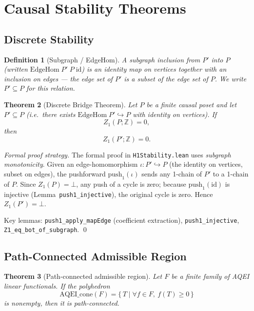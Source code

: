 \documentclass[12pt]{article}
\newtheorem{theorem}{Theorem}[section]
\newtheorem{definition}[theorem]{Definition}
\begin{document}
\section{Causal Stability Theorems}

\subsection{Discrete Stability}

\begin{definition}[Subgraph / EdgeHom]
A \emph{subgraph inclusion} from $P'$ into $P$
(written $\mathrm{EdgeHom}\; P'\; P\; \mathrm{id}$) is an identity map on
vertices together with an inclusion on edges --- the edge set of $P'$
is a subset of the edge set of $P$.  We write $P' \subseteq P$ for this relation.
\end{definition}

\begin{theorem}[Discrete Bridge Theorem]\label{thm:discrete-bridge}
Let $P$ be a finite causal poset and let $P' \subseteq P$
(i.e.\ there exists $\mathrm{EdgeHom}\; P' \hookrightarrow P$ with identity on vertices).
If
\[
  Z_1(P;\mathbb{Z}) = 0,
\]
then
\[
  Z_1(P';\mathbb{Z}) = 0.
\]
\end{theorem}

\begin{proof}[Formal proof strategy]
The formal proof in \texttt{H1Stability.lean} uses \emph{subgraph monotonicity}.
Given an edge-homomorphism $\iota: P' \hookrightarrow P$ (the identity on vertices,
subset on edges), the pushforward $\mathrm{push}_1(\iota)$ sends any 1-chain of
$P'$ to a 1-chain of $P$.  Since $Z_1(P) = \bot$, any push of a cycle is zero;
because $\mathrm{push}_1(\mathrm{id})$ is injective (Lemma~\texttt{push1\_injective}),
the original cycle is zero.  Hence $Z_1(P') = \bot$.

Key lemmas: \texttt{push1\_apply\_mapEdge} (coefficient extraction),
\texttt{push1\_injective}, \texttt{Z1\_eq\_bot\_of\_subgraph}. \qed
\end{proof}

\subsection{Path-Connected Admissible Region}

\begin{theorem}[Path-connected admissible region]\label{thm:path-connected}
Let $F$ be a finite family of AQEI linear functionals.
If the polyhedron
\[
  \mathrm{AQEI\_cone}(F)
  =
  \bigl\{\, T \mid \forall f \in F,\ f(T) \ge 0 \,\bigr\}
\]
is nonempty, then it is path-connected.
\end{theorem}
\end{document}
